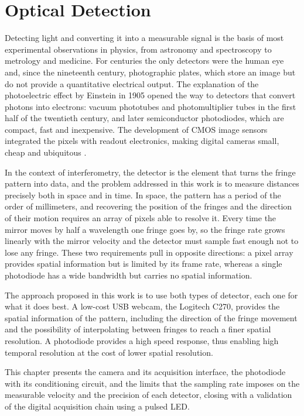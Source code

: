 \chapter{Optical Detection}

Detecting light and converting it into a measurable signal is the basis of most experimental observations in physics, from astronomy and spectroscopy to metrology and medicine. For centuries the only detectors were the human eye and, since the nineteenth century, photographic plates, which store an image but do not provide a quantitative electrical output. The explanation of the photoelectric effect by Einstein in 1905 opened the way to detectors that convert photons into electrons: vacuum phototubes and photomultiplier tubes in the first half of the twentieth century, and later semiconductor photodiodes, which are compact, fast and inexpensive. The development of CMOS image sensors integrated the pixels with readout electronics, making digital cameras small, cheap and ubiquitous \cite{stefanovCMOSImageSensors2023}.

In the context of interferometry, the detector is the element that turns the fringe pattern into data, and the problem addressed in this work is to measure distances precisely both in space and in time. In space, the pattern has a period of the order of millimeters, and recovering the position of the fringes and the direction of their motion requires an array of pixels able to resolve it. Every time the mirror moves by half a wavelength one fringe goes by, so the fringe rate grows linearly with the mirror velocity and the detector must sample fast enough not to lose any fringe. These two requirements pull in opposite directions: a pixel array provides spatial information but is limited by its frame rate, whereas a single photodiode has a wide bandwidth but carries no spatial information.

The approach proposed in this work is to use both types of detector, each one for what it does best. A low-cost USB webcam, the Logitech C270, provides the spatial information of the pattern, including the direction of the fringe movement and the possibility of interpolating between fringes to reach a finer spatial resolution. A photodiode provides a high speed response, thus enabling high temporal resolution at the cost of lower spatial resolution.

This chapter presents the camera and its acquisition interface, the photodiode with its conditioning circuit, and the limits that the sampling rate imposes on the measurable velocity and the precision of each detector, closing with a validation of the digital acquisition chain using a pulsed LED.







